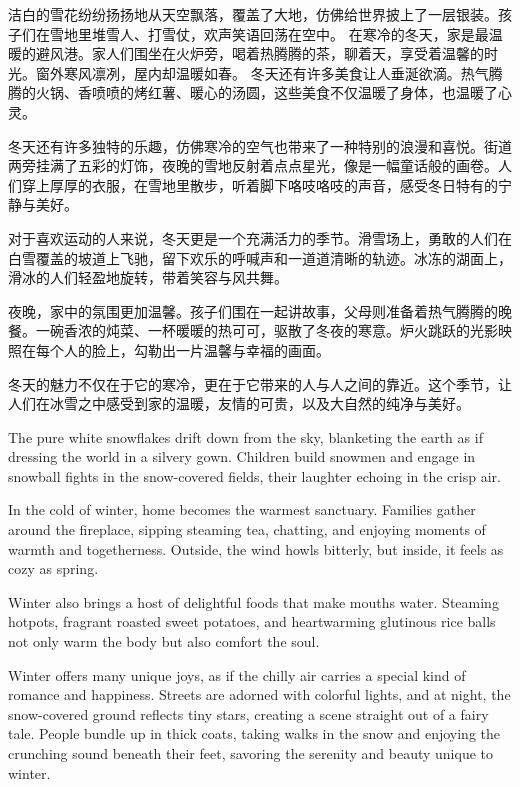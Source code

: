 \documentclass{ctexart}
\begin{document}
\begin{spacing}{1.5}
洁白的雪花纷纷扬扬地从天空飘落，覆盖了大地，仿佛给世界披上了一层银装。孩子们在雪地里堆雪人、打雪仗，欢声笑语回荡在空中。
在寒冷的冬天，家是最温暖的避风港。家人们围坐在火炉旁，喝着热腾腾的茶，聊着天，享受着温馨的时光。窗外寒风凛冽，屋内却温暖如春。
冬天还有许多美食让人垂涎欲滴。热气腾腾的火锅、香喷喷的烤红薯、暖心的汤圆，这些美食不仅温暖了身体，也温暖了心灵。
\end{spacing}
冬天还有许多独特的乐趣，仿佛寒冷的空气也带来了一种特别的浪漫和喜悦。街道两旁挂满了五彩的灯饰，夜晚的雪地反射着点点星光，像是一幅童话般的画卷。人们穿上厚厚的衣服，在雪地里散步，听着脚下咯吱咯吱的声音，感受冬日特有的宁静与美好。

对于喜欢运动的人来说，冬天更是一个充满活力的季节。滑雪场上，勇敢的人们在白雪覆盖的坡道上飞驰，留下欢乐的呼喊声和一道道清晰的轨迹。冰冻的湖面上，滑冰的人们轻盈地旋转，带着笑容与风共舞。

夜晚，家中的氛围更加温馨。孩子们围在一起讲故事，父母则准备着热气腾腾的晚餐。一碗香浓的炖菜、一杯暖暖的热可可，驱散了冬夜的寒意。炉火跳跃的光影映照在每个人的脸上，勾勒出一片温馨与幸福的画面。

\noindent 冬天的魅力不仅在于它的寒冷，更在于它带来的人与人之间的靠近。这个季节，让人们在冰雪之中感受到家的温暖，友情的可贵，以及大自然的纯净与美好。

The pure white snowflakes drift down from the sky, blanketing the earth as if dressing the world in a silvery gown. Children build snowmen and engage in snowball fights in the snow-covered fields, their laughter echoing in the crisp air.

In the cold of winter, home becomes the warmest sanctuary. Families gather around the fireplace, sipping steaming tea, chatting, and enjoying moments of warmth and togetherness. Outside, the wind howls bitterly, but inside, it feels as cozy as spring.

Winter also brings a host of delightful foods that make mouths water. Steaming hotpots, fragrant roasted sweet potatoes, and heartwarming glutinous rice balls not only warm the body but also comfort the soul.

Winter offers many unique joys, as if the chilly air carries a special kind of romance and happiness. Streets are adorned with colorful lights, and at night, the snow-covered ground reflects tiny stars, creating a scene straight out of a fairy tale. People bundle up in thick coats, taking walks in the snow and enjoying the crunching sound beneath their feet, savoring the serenity and beauty unique to winter.
\end{document}
